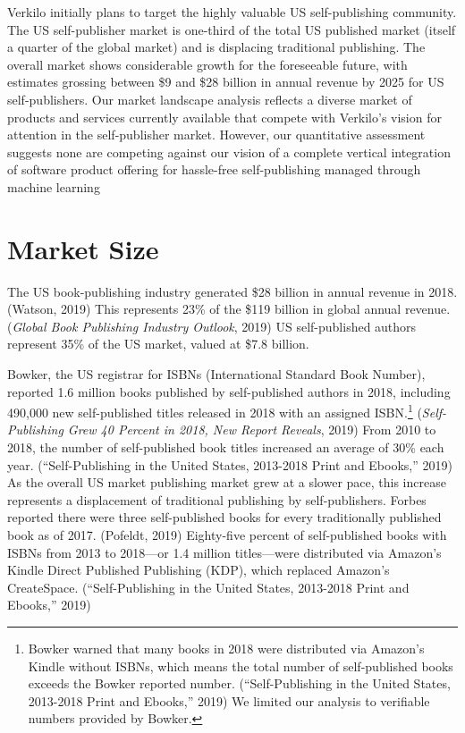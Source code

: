 \documentclass[11pt,openany]{book}
\begin{document}
Verkilo initially plans to target the highly valuable US self-publishing
community. The US self-publisher market is one-third of the total US
published market (itself a quarter of the global market) and is
displacing traditional publishing. The overall market shows considerable
growth for the foreseeable future, with estimates grossing between \$9
and \$28 billion in annual revenue by 2025 for US self-publishers. Our
market landscape analysis reflects a diverse market of products and
services currently available that compete with Verkilo's vision for
attention in the self-publisher market. However, our quantitative
assessment suggests none are competing against our vision of a complete
vertical integration of software product offering for hassle-free
self-publishing managed through machine learning

\newpage

\hypertarget{market-size}{%
\section{Market Size}\label{market-size}}

The US book-publishing industry generated \$28 billion in annual revenue
in 2018. (Watson, 2019) This represents 23\% of the \$119 billion in
global annual revenue. (\emph{Global Book Publishing Industry Outlook},
2019) US self-published authors represent 35\% of the US market, valued
at \$7.8 billion.

Bowker, the US registrar for ISBNs (International Standard Book Number),
reported 1.6 million books published by self-published authors in 2018,
including 490,000 new self-published titles released in 2018 with an
assigned ISBN.\footnote{Bowker warned that many books in 2018 were
  distributed via Amazon's Kindle without ISBNs, which means the total
  number of self-published books exceeds the Bowker reported number.
  (``Self-Publishing in the United States, 2013-2018 Print and Ebooks,''
  2019) We limited our analysis to verifiable numbers provided by
  Bowker.} (\emph{Self-Publishing Grew 40 Percent in 2018, New Report
Reveals}, 2019) From 2010 to 2018, the number of self-published book
titles increased an average of 30\% each year. (``Self-Publishing in the
United States, 2013-2018 Print and Ebooks,'' 2019) As the overall US
market publishing market grew at a slower pace, this increase represents
a displacement of traditional publishing by self-publishers. Forbes
reported there were three self-published books for every traditionally
published book as of 2017. (Pofeldt, 2019) Eighty-five percent of
self-published books with ISBNs from 2013 to 2018---or 1.4 million
titles---were distributed via Amazon's Kindle Direct Published
Publishing (KDP), which replaced Amazon's CreateSpace.
(``Self-Publishing in the United States, 2013-2018 Print and Ebooks,''
2019)
\end{document}
